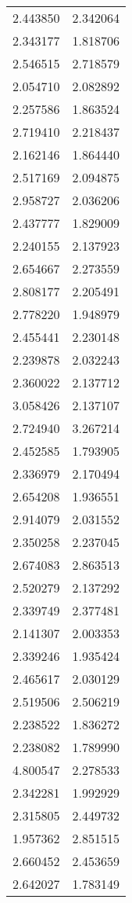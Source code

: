 \begin{longtable}[c]{ll}
    2.443850 & 2.342064 \\
    2.343177 & 1.818706 \\
    2.546515 & 2.718579 \\
    2.054710 & 2.082892 \\
    2.257586 & 1.863524 \\
    2.719410 & 2.218437 \\
    2.162146 & 1.864440 \\
    2.517169 & 2.094875 \\
    2.958727 & 2.036206 \\
    2.437777 & 1.829009 \\
    2.240155 & 2.137923 \\
    2.654667 & 2.273559 \\
    2.808177 & 2.205491 \\
    2.778220 & 1.948979 \\
    2.455441 & 2.230148 \\
    2.239878 & 2.032243 \\
    2.360022 & 2.137712 \\
    3.058426 & 2.137107 \\
    2.724940 & 3.267214 \\
    2.452585 & 1.793905 \\
    2.336979 & 2.170494 \\
    2.654208 & 1.936551 \\
    2.914079 & 2.031552 \\
    2.350258 & 2.237045 \\
    2.674083 & 2.863513 \\
    2.520279 & 2.137292 \\
    2.339749 & 2.377481 \\
    2.141307 & 2.003353 \\
    2.339246 & 1.935424 \\
    2.465617 & 2.030129 \\
    2.519506 & 2.506219 \\
    2.238522 & 1.836272 \\
    2.238082 & 1.789990 \\
    4.800547 & 2.278533 \\
    2.342281 & 1.992929 \\
    2.315805 & 2.449732 \\
    1.957362 & 2.851515 \\
    2.660452 & 2.453659 \\
    2.642027 & 1.783149 \\

\end{longtable}
